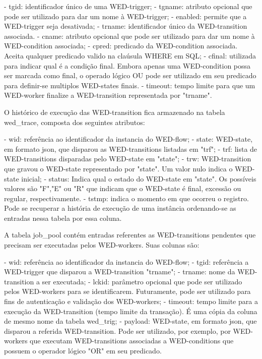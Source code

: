   - tgid: identificador único de uma WED-trigger;
  - tgname: atributo opcional que pode ser utilizado para dar um nome à WED-trigger;
  - enabled: permite que a WED-trigger seja desativada;
  - trname: identificador único da WED-transition associada.
  - cname: atributo opcional que pode ser utilizado para dar um nome à WED-condition associada;
  - cpred: predicado da WED-condition associada. Aceita qualquer predicado valido na claúsula WHERE em SQL;
  - cfinal: utilizada para indicar qual é a condição final. Embora apenas uma WED-condition possa ser marcada como final,
           o operado lógico OU pode ser utilizado em seu predicado para definir-se multiplos WED-states finais.
  - timeout: tempo limite para que um WED-worker finalize a WED-transition representada por "trname".

  O histórico de execução das WED-transition fica armazenado na tabela wed_trace, composta dos seguintes atributos:
  
  - wid: referência ao identificador da instancia do WED-flow;
  - state: WED-state, em formato json, que disparou as WED-transitions listadas em "trf";
  - trf: lista de WED-transitions disparadas pelo WED-state em "state";
  - trw: WED-transition que gravou o WED-state representado por "state". Um valor nulo indica o WED-state inicial;
  - status: Indica qual o estado do WED-state em "state". Os possíveis valores são "F","E" ou "R" que indicam que o WED-state
           é final, excessão ou regular, respectivamente.
  - tstmp: indica o momento em que ocorreu o registro. Pode se recuperar a história de execução de uma instância ordenando-se
          as entradas nessa tabela por essa coluna.
  
  A tabela job_pool contém entradas referentes as WED-transitions pendentes que precisam ser executadas pelos WED-workers.
Suas colunas são:
  
  - wid: referência ao identificador da instancia do WED-flow;
  - tgid: referência a WED-trigger que disparou a WED-transition "trname";
  - trname: nome da WED-transition a ser executada;
  - lckid: parâmetro opcional que pode ser utilizado pelos WED-workers para se identificarem. Futuramente, pode ser utilizado
          para fins de autenticação e validação dos WED-workers;
  - timeout: tempo limite para a execução da WED-transition (tempo limite da transação). É uma cópia da coluna de mesmo
            nome da tabela wed_trig;
  - payload: WED-state, em formato json, que disparou a referida WED-transition. Pode ser utilizado, por exemplo, por
            WED-workers que executam WED-transitions associadas a WED-conditions que possuem o operador lógico "OR" em 
            seu predicado.
  
